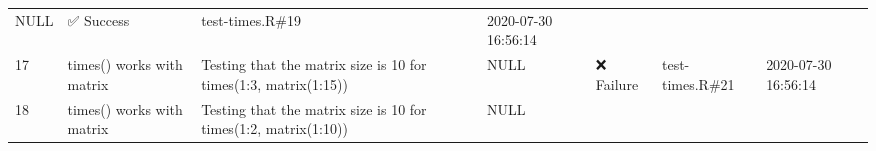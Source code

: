 \documentclass[
]{book}
\begin{document}
\begin{longtable}[]{@{}lllllll@{}}
\begin{minipage}[t]{0.05\columnwidth}
NULL\strut
\end{minipage} & \begin{minipage}[t]{0.22\columnwidth}\raggedright
✅ Success\strut
\end{minipage} & \begin{minipage}[t]{0.06\columnwidth}\raggedright
test-times.R\#19\strut
\end{minipage} & \begin{minipage}[t]{0.08\columnwidth}\raggedright
2020-07-30 16:56:14\strut
\end{minipage}\tabularnewline
\begin{minipage}[t]{0.01\columnwidth}\raggedright
17\strut
\end{minipage} & \begin{minipage}[t]{0.14\columnwidth}\raggedright
times() works with matrix\strut
\end{minipage} & \begin{minipage}[t]{0.25\columnwidth}\raggedright
Testing that the matrix size is 10 for times(1:3, matrix(1:15))\strut
\end{minipage} & \begin{minipage}[t]{0.05\columnwidth}\raggedright
NULL\strut
\end{minipage} & \begin{minipage}[t]{0.22\columnwidth}\raggedright
❌ Failure\strut
\end{minipage} & \begin{minipage}[t]{0.06\columnwidth}\raggedright
test-times.R\#21\strut
\end{minipage} & \begin{minipage}[t]{0.08\columnwidth}\raggedright
2020-07-30 16:56:14\strut
\end{minipage}\tabularnewline
\begin{minipage}[t]{0.01\columnwidth}\raggedright
18\strut
\end{minipage} & \begin{minipage}[t]{0.14\columnwidth}\raggedright
times() works with matrix\strut
\end{minipage} & \begin{minipage}[t]{0.25\columnwidth}\raggedright
Testing that the matrix size is 10 for times(1:2, matrix(1:10))\strut
\end{minipage} & \begin{minipage}[t]{0.05\columnwidth}\raggedright
NULL\strut
\end{minipage} & \begin{minipage}[t]{0.22\columnwidth}\raggedright

\end{minipage}
\end{longtable}
\end{document}
